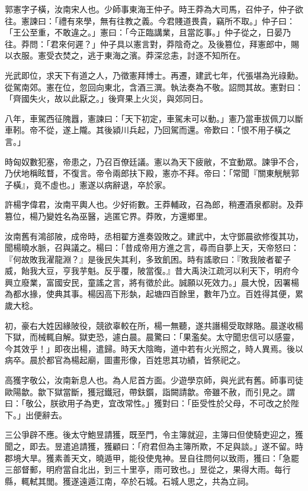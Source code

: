 \begin{pinyinscope}
郭憲字子橫，汝南宋人也。少師事東海王仲子。時王莽為大司馬，召仲子，仲子欲往。憲諫曰：「禮有來學，無有往教之義。今君賤道畏貴，竊所不取。」仲子曰：「王公至重，不敢違之。」憲曰：「今正臨講業，且當訖事。」仲子從之，日晏乃往。莽問：「君來何遲？」仲子具以憲言對，莽陰奇之。及後篡位，拜憲郎中，賜以衣服。憲受衣焚之，逃于東海之濱。莽深忿恚，討逐不知所在。

光武即位，求天下有道之人，乃徵憲拜博士。再遷，建武七年，代張堪為光祿勳。從駕南郊。憲在位，忽回向東北，含酒三潠。執法奏為不敬。詔問其故。憲對曰：「齊國失火，故以此厭之。」後齊果上火災，與郊同日。

八年，車駕西征隗囂，憲諫曰：「天下初定，車駕未可以動。」憲乃當車拔佩刀以斷車靷。帝不從，遂上隴。其後潁川兵起，乃回駕而還。帝歎曰：「恨不用子橫之言。」

時匈奴數犯塞，帝患之，乃召百僚廷議。憲以為天下疲敝，不宜動眾。諫爭不合，乃伏地稱眩瞀，不復言。帝令兩郎扶下殿，憲亦不拜。帝曰：「常聞『關東觥觥郭子橫』，竟不虛也。」憲遂以病辭退，卒於家。

許楊字偉君，汝南平輿人也。少好術數。王莽輔政，召為郎，稍遷酒泉都尉。及莽篡位，楊乃變姓名為巫醫，逃匿它界。莽敗，方還鄉里。

汝南舊有鴻郤陂，成帝時，丞相翟方進奏毀敗之。建武中，太守鄧晨欲修復其功，聞楊曉水脈，召與議之。楊曰：「昔成帝用方進之言，尋而自夢上天，天帝怒曰：『何故敗我濯龍淵？』是後民失其利，多致飢困。時有謠歌曰：『敗我陂者翟子威，飴我大豆，亨我芋魁。反乎覆，陂當復。』昔大禹決江疏河以利天下，明府今興立廢業，富國安民，童謠之言，將有徵於此。誠願以死效力。」晨大悅，因署楊為都水掾，使典其事。楊因高下形埶，起塘四百餘里，數年乃立。百姓得其便，累歲大稔。

初，豪右大姓因緣陂役，競欲辜較在所，楊一無聽，遂共譖楊受取賕賂。晨遂收楊下獄，而械輒自解。獄吏恐，遽白晨。晨驚曰：「果濫矣。太守聞忠信可以感靈，今其效乎！」即夜出楊，遣歸。時天大陰晦，道中若有火光照之，時人異焉。後以病卒。晨於都官為楊起廟，圖畫形像，百姓思其功績，皆祭祀之。

高獲字敬公，汝南新息人也。為人尼首方面。少遊學京師，與光武有舊。師事司徒歐陽歙。歙下獄當斷，獲冠鐵冠，帶鈇鑕，詣闕請歙。帝雖不赦，而引見之。謂曰：「敬公，朕欲用子為吏，宜改常性。」獲對曰：「臣受性於父母，不可改之於陛下。」出便辭去。

三公爭辟不應。後太守鮑昱請獲，既至門，令主簿就迎，主簿曰但使騎吏迎之，獲聞之，即去。昱遣追請獲，獲顧曰：「府君但為主簿所欺，不足與談。」遂不留。時郡境大旱。獲素善天文，曉遁甲，能役使鬼神。昱自往問何以致雨，獲曰：「急罷三部督郵，明府當自北出，到三十里亭，雨可致也。」昱從之，果得大雨。每行縣，輒軾其閭。獲遂遠遁江南，卒於石城。石城人思之，共為立祠。


\end{pinyinscope}
